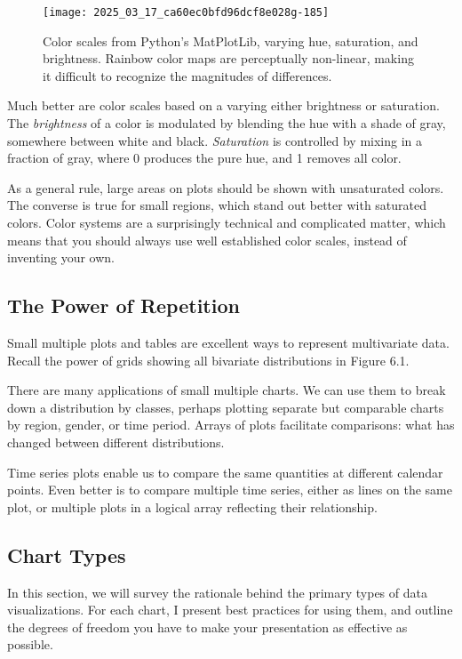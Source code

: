 \documentclass[10pt]{article}
\begin{document}
\begin{figure}[h]
  \centering
  \texttt{[image: 2025\_03\_17\_ca60ec0bfd96dcf8e028g-185]}
  \caption{Color scales from Python's MatPlotLib, varying hue, saturation, and brightness. Rainbow color maps are perceptually non-linear, making it difficult to recognize the magnitudes of differences.}
  \label{fig:color-scales}
\end{figure}

Much better are color scales based on a varying either brightness or saturation. The \emph{brightness} of a color is modulated by blending the hue with a shade of gray, somewhere between white and black. \emph{Saturation} is controlled by mixing in a fraction of gray, where 0 produces the pure hue, and 1 removes all color.

As a general rule, large areas on plots should be shown with unsaturated colors. The converse is true for small regions, which stand out better with saturated colors. Color systems are a surprisingly technical and complicated matter, which means that you should always use well established color scales, instead of inventing your own.

\subsection{The Power of Repetition}
Small multiple plots and tables are excellent ways to represent multivariate data. Recall the power of grids showing all bivariate distributions in Figure 6.1.

There are many applications of small multiple charts. We can use them to break down a distribution by classes, perhaps plotting separate but comparable charts by region, gender, or time period. Arrays of plots facilitate comparisons: what has changed between different distributions.

Time series plots enable us to compare the same quantities at different calendar points. Even better is to compare multiple time series, either as lines on the same plot, or multiple plots in a logical array reflecting their relationship.

\subsection{Chart Types}
In this section, we will survey the rationale behind the primary types of data visualizations. For each chart, I present best practices for using them, and outline the degrees of freedom you have to make your presentation as effective as possible.
\end{document}

